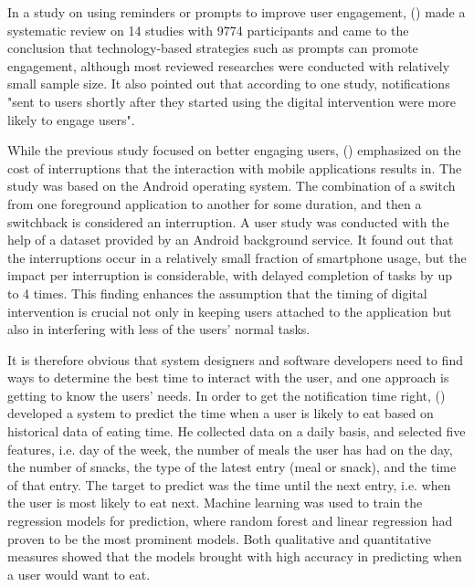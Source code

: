 \noindent In a study on using reminders or prompts to improve user engagement, \citeauthor{25_timing_review} (\citeyear{25_timing_review}) made a systematic review on 14 studies with 9774 participants and came to the conclusion that technology-based strategies such as prompts can promote engagement, although most reviewed researches were conducted with relatively small sample size. It also pointed out that according to one study, notifications "sent to users shortly after they started using the digital intervention were more likely to engage users".\bigskip

\noindent While the previous study focused on better engaging users, \citeauthor{26_cost_interruption} (\citeyear{26_cost_interruption}) emphasized on the cost of interruptions that the interaction with mobile applications results in. The study was based on the Android operating system. The combination of a switch from one foreground application to another for some duration, and then a switchback is considered an interruption. A user study was conducted with the help of a dataset provided by an Android background service. It found out that the interruptions occur in a relatively small fraction of smartphone usage, but the impact per interruption is considerable, with delayed completion of tasks by up to 4 times. This finding enhances the assumption that the timing of digital intervention is crucial not only in keeping users attached to the application but also in interfering with less of the users' normal tasks.\bigskip

\noindent It is therefore obvious that system designers and software developers need to find ways to determine the best time to interact with the user, and one approach is getting to know the users' needs. In order to get the notification time right, \citeauthor{27_oguz} (\citeyear{27_oguz}) developed a system to predict the time when a user is likely to eat based on historical data of eating time. He collected data on a daily basis, and selected five features, i.e. day of the week, the number of meals the user has had on the day, the number of snacks, the type of the latest entry (meal or snack), and the time of that entry. The target to predict was the time until the next entry, i.e. when the user is most likely to eat next. Machine learning was used to train the regression models for prediction, where random forest and linear regression had proven to be the most prominent models. Both qualitative and quantitative measures showed that the models brought with high accuracy in predicting when a user would want to eat.

